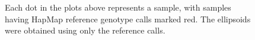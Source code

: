 \documentclass{scrartcl}
\begin{document}
\begin{figure}[H]
    \centering
    \caption{Each dot in the plots above represents a sample, with
             samples having HapMap reference genotype calls marked red.
             The ellipsoids were obtained using only the reference calls.}
    \label{fig:defined_sparse_cluster}
\end{figure}
\end{document}
